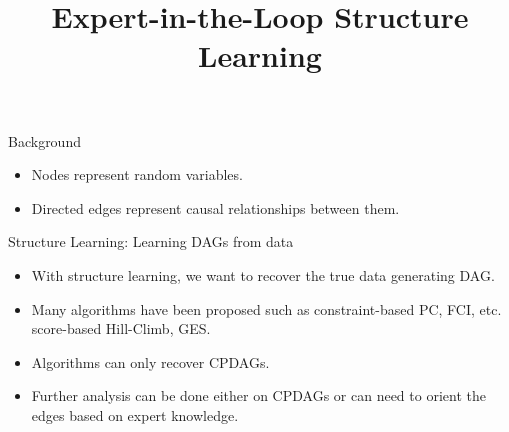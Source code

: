 \documentclass{beamer}
\begin{document}
\title[]{Expert-in-the-Loop Structure Learning}
\date{}

\maketitle

\begin{frame}{Background}
	
	\begin{itemize}
		\item Nodes represent random variables.
		\item Directed edges represent causal relationships between them.
	\end{itemize}
\end{frame}

\begin{frame}{Structure Learning: Learning DAGs from data}
	\begin{figure}
		\centering
	\end{figure}

	\begin{itemize}
		\item With structure learning, we want to recover the true data generating DAG.
		\item Many algorithms have been proposed such as constraint-based PC, FCI, etc. score-based Hill-Climb, GES.
		\item Algorithms can only recover CPDAGs.
		\item Further analysis can be done either on CPDAGs or can need to orient the edges based on expert knowledge.
	\end{itemize}
\end{frame}
\end{document}
